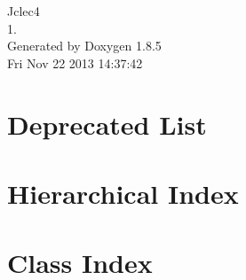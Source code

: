 \documentclass[twoside]{book}
\newcommand{\clearemptydoublepage}{%
  \newpage{\pagestyle{empty}\cleardoublepage}%
}
\begin{document}
\hypersetup{pageanchor=false}
\begin{titlepage}
\vspace*{7cm}
\begin{center}%
{\Large Jclec4 \\[1ex]\large 1. }\\
\vspace*{1cm}
{\large Generated by Doxygen 1.8.5}\\
\vspace*{0.5cm}
{\small Fri Nov 22 2013 14:37:42}\\
\end{center}
\end{titlepage}
\clearemptydoublepage
\tableofcontents
\clearemptydoublepage
{}
\hypersetup{pageanchor=true}

\chapter{Deprecated List}
\label{deprecated}
\hypertarget{deprecated}{}

\chapter{Hierarchical Index}

\chapter{Class Index}

\end{document}
